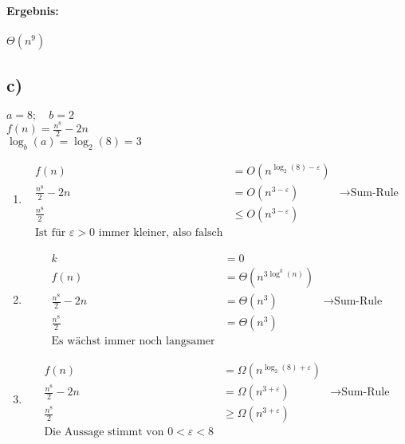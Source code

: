 \documentclass[12pt,letterpaper]{article}
\begin{document}
\paragraph{Ergebnis:}
$ \Theta(n^9)$

\subsection*{c)}
$a = 8;\quad b = 2$ \\
$f(n) =  \frac{n^8}{2} - 2n$ \\
$\log_b(a) = \log_2(8) = 3$
\begin{enumerate}
    \item \begin{align*}
              f(n)               & = O(n^{\log_2(8) - \varepsilon})                               \\
              \frac{n^8}{2} - 2n & = O(n^{3 - \varepsilon})         & \rightarrow \text{Sum-Rule} \\
              \frac{n^8}{2}      & \leq O(n^{3 - \varepsilon})                                    \\
              \text{Ist für } \varepsilon > 0 \text{ immer kleiner, also falsch}
          \end{align*}
    \item \begin{align*}
              k                  & = 0                                                    \\
              f(n)               & = \Theta(n^{3\log^k(n)})                               \\
              \frac{n^8}{2} - 2n & = \Theta(n^3)            & \rightarrow \text{Sum-Rule} \\
              \frac{n^8}{2}      & = \Theta(n^3)                                          \\
              \text{Es wächst immer noch langsamer}
          \end{align*}
    \item \begin{align*}
              f(n)               & = \Omega(n^{\log_2(8) + \varepsilon})                               \\
              \frac{n^8}{2} - 2n & = \Omega(n^{3 + \varepsilon})         & \rightarrow \text{Sum-Rule} \\
              \frac{n^8}{2}      & \geq \Omega(n^{3 + \varepsilon})                                    \\
              \text{Die Aussage stimmt von } 0 < \varepsilon < 8
          \end{align*}
\end{enumerate}
\end{document}
